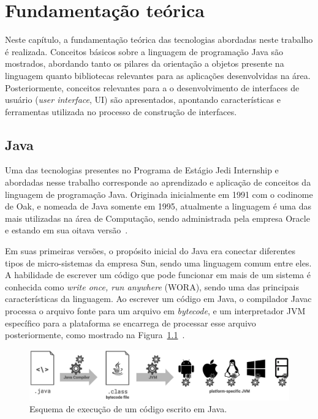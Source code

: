\chapter{Fundamentação teórica}
\label{cap:fundamentacao-teorica}

Neste capítulo, a fundamentação teórica das tecnologias abordadas neste trabalho é realizada. Conceitos básicos sobre a linguagem de programação Java são mostrados, abordando tanto os pilares da orientação a objetos presente na linguagem quanto bibliotecas relevantes para as aplicações desenvolvidas na área. Posteriormente, conceitos relevantes para a o desenvolvimento de interfaces de usuário (\textit{user interface}, UI) são apresentados, apontando características e ferramentas utilizada no processo de construção de interfaces.

\section{Java}
\label{sec:java}

Uma das tecnologias presentes no Programa de Estágio Jedi Internship e abordadas nesse trabalho corresponde ao aprendizado e aplicação de conceitos da linguagem de programação Java. Originada inicialmente em 1991 com o codinome de Oak, e nomeada de Java somente em 1995, atualmente a linguagem é uma das mais utilizadas na área de Computação, sendo administrada pela empresa Oracle e estando em sua oitava versão~\cite{ocastudyguide-2015}.

Em suas primeiras versões, o propósito inicial do Java era conectar diferentes tipos de micro-sistemas da empresa Sun, sendo uma linguagem comum entre eles. A habilidade de escrever um código que pode funcionar em mais de um sistema é conhecida como \textit{write once, run anywhere} (WORA), sendo uma das principais características da linguagem. Ao escrever um código em Java, o compilador Javac processa o arquivo fonte para um arquivo em \textit{bytecode}, e um interpretador JVM específico para a plataforma se encarrega de processar esse arquivo posteriormente, como mostrado na Figura~\ref{fig:java-fluxo}~\cite{ocastudyguide-2015}.

\begin{figure}[htb!]
  \centering
  \caption{Esquema de execução de um código escrito em Java.}
  \label{fig:java-fluxo}
  \includegraphics[width=\textwidth, keepaspectratio=true]{img/java-fluxo}
\end{figure}

